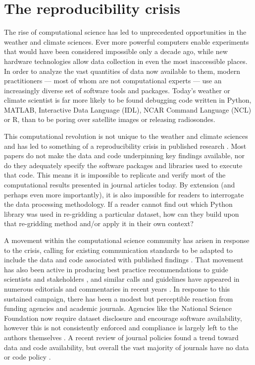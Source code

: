\section{The reproducibility crisis}

The rise of computational science has led to unprecedented opportunities in the weather and climate sciences. Ever more powerful computers enable experiments that would have been considered impossible only a decade ago, while new hardware technologies allow data collection in even the most inaccessible places. In order to analyze the vast quantities of data now available to them, modern practitioners –-- most of whom are not computational experts –-- use an increasingly diverse set of software tools and packages. Today's weather or climate scientist is far more likely to be found debugging code written in Python, MATLAB, Interactive Data Language (IDL), NCAR Command Language (NCL) or R, than to be poring over satellite images or releasing radiosondes. 

This computational revolution is not unique to the weather and climate sciences and has led to something of a reproducibility crisis in published research \citep[e.g.][]{Peng2011}. Most papers do not make the data and code underpinning key findings available, nor do they adequately specify the software packages and libraries used to execute that code. This means it is impossible to replicate and verify most of the computational results presented in journal articles today. By extension (and perhaps even more importantly), it is also impossible for readers to interrogate the data processing methodology. If a reader cannot find out which Python library was used in re-gridding a particular dataset, how can they build upon that re-gridding method and/or apply it in their own context? 

A movement within the computational science community has arisen in response to the crisis, calling for existing communication standards to be adapted to include the data and code associated with published findings \citep[e.g.][]{Stodden2014}. That movement has also been active in producing best practice recommendations to guide scientists and stakeholders \citep[e.g.][]{Prlic2012,Stodden2012a,Sandve2013,Stodden2014}, and similar calls and guidelines have appeared in numerous editorials and commentaries in recent years \citep[e.g.][]{Barnes2010,Merali2010,Ince2012}. In response to this sustained campaign, there has been a modest but perceptible reaction from funding agencies and academic journals. Agencies like the National Science Foundation now require dataset disclosure and encourage software availability, however this is not consistently enforced and compliance is largely left to the authors themselves \citep{Stodden2013}. A recent review of journal policies found a trend toward data and code availability, but overall the vast majority of journals have no data or code policy \citep{Stodden2013}. 

